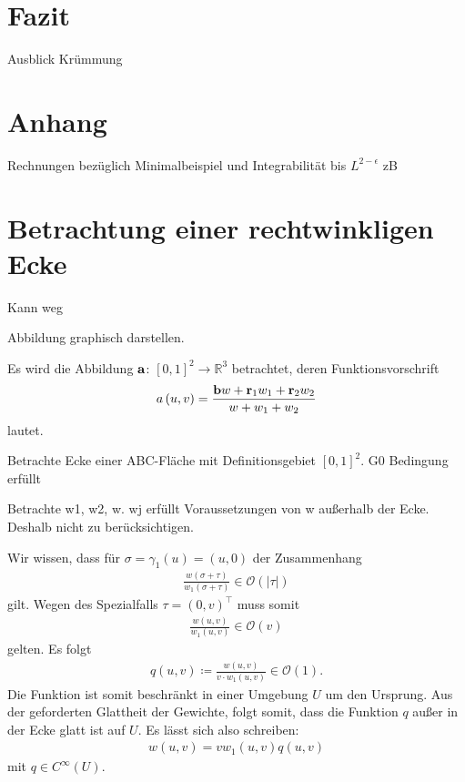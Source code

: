 \documentclass[10pt,a4paper,oneside]{report}
\newcommand{\R}{\mathbb{R}}
\newcommand{\OL}{\mathcal{O}}
\begin{document}
\chapter{Fazit}
Ausblick Krümmung


\chapter{Anhang}
Rechnungen bezüglich Minimalbeispiel und Integrabilität bis $L^{2-\epsilon}$ zB

\chapter{Betrachtung einer rechtwinkligen Ecke}
Kann weg


Abbildung graphisch darstellen. 

Es wird die Abbildung $\bold{a}$: $\left[0,1\right]^2 \to \R^3$ betrachtet, deren Funktionsvorschrift 
\begin{align*}
a\left(u,v\right) = \frac{\bold{b} w + \bold{r}_1 w_1 + \bold{r}_2 w_2}{w+w_1+w_2}
\end{align*}
lautet.

Betrachte Ecke einer ABC-Fläche mit Definitionsgebiet $\left[0,1\right]^2$.
G0 Bedingung erfüllt

Betrachte w1, w2, w.
wj erfüllt Voraussetzungen von w außerhalb der Ecke. Deshalb nicht zu berücksichtigen.

Wir wissen, dass für $\sigma = \gamma_1\left(u\right) = \left(u,0\right)$ der Zusammenhang
\begin{align*}
\frac{w\left(\sigma + \tau\right)}{w_1\left(\sigma + \tau\right)} \in \OL\left(|\tau|\right)
\end{align*}
gilt.
Wegen des Spezialfalls $\tau = \left( 0, v\right)^{\top}$ muss somit
\begin{align*}
\frac{w\left(u,v\right)}{w_1\left(u,v\right)} \in \OL\left(v\right)
\end{align*}
gelten.
Es folgt
\begin{align*}
q\left(u,v\right) \coloneqq \frac{w\left(u,v\right)}{v \cdot w_1\left(u,v\right)} \in \OL\left(1\right).
\end{align*}
Die Funktion ist somit beschränkt in einer Umgebung $U$ um den Ursprung. 
Aus der geforderten Glattheit der Gewichte, folgt somit, dass die Funktion $q$ außer in der Ecke glatt ist auf $U$.
Es lässt sich also schreiben:
\begin{align*}
w\left(u,v\right) = v w_1\left(u,v\right) q\left(u,v\right)
\end{align*}
mit $q \in C^\infty\left(U\right)$.
\end{document}
